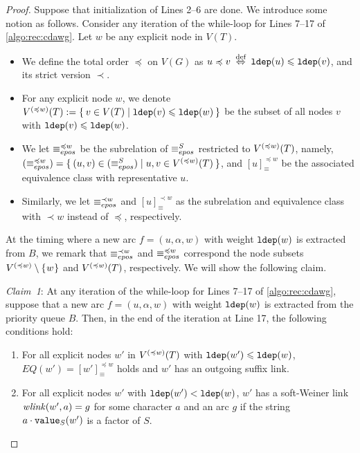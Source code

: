 \begin{proof}
Suppose that initialization of Lines 2--6 are done. 
We introduce some notion as follows.
Consider any iteration of the while-loop for Lines 7--17 of \cref{algo:rec:cdawg}.
Let $w$ be any explicit node in $V(T)$.
\begin{itemize}
\item We define the total order $\preceq$ on $V(G)$ as $u \preceq v \iffdef \ldep(u) \le \ldep(v)$, and its strict version $\prec$. 
\item For any explicit node $w$, we denote $V\rk{\preceq w}(T) := \sete{ v \in V(T) \mid \ldep(v) \le \ldep(w) }$ be the subset of all nodes $v$ with $\ldep(v) \le \ldep(w)$.
  
\item We let $\eqepos[\preceq w]$ be the subrelation of $\eqepos$ restricted to $V\rk{\preceq w}(T)$, namely, $(\eqepos[\preceq w]) = \sete{ (u,v) \in (\eqepos) \mid u, v \in V\rk{\preceq w}(T)}$, and $[u]^{\preceq w}_{\equiv}$ be the associated equivalence class with representative $u$.

\item Similarly, we let $\eqepos[\prec w]$ and $[u]^{\prec w}_{\equiv}$ as the subrelation and equivalence class with $\prec w$ instead of $\preceq$, respectively. 
\end{itemize}

At the timing where a new arc $f = (u, \alpha, w)$ with weight $\ldep(w)$ is extracted from $B$, we remark that $\eqepos[\prec w]$ and $\eqepos[\preceq w]$ correspond the node subsets $V\rk{\preceq w}\setminus\set{w}$ and $V\rk{\preceq w}(T)$, respectively. We will show the following claim.

\textit{Claim~1}: At any iteration of the while-loop for Lines 7--17 of \cref{algo:rec:cdawg}, suppose that a new arc $f = (u, \alpha, w)$ with weight $\ldep(w)$ is extracted from the priority queue $B$. Then, in the end of the iteration at Line 17, the following conditions hold:  
\begin{enumerate}
  \item For all explicit nodes $w'$ in $V\rk{\preceq w}(T)$ with $\ldep(w') \le \ldep(w)$, $EQ(w') = [w']^{\preceq w}_{\equiv}$ holds and $w'$ has an outgoing suffix link.
  \item For all explicit nodes $w'$ with $\ldep(w') < \ldep(w)$, $w'$ has a soft-Weiner link $\wlink(w', a) = g$ for some character $a$ and an arc $g$ if the string $a\cdot\Value(w')$ is a factor of $S$. 
\end{enumerate}



\end{proof}
